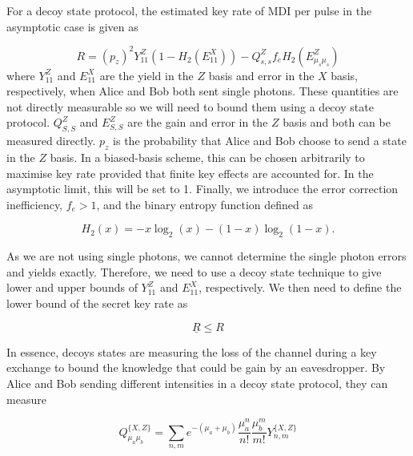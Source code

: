 For a decoy state protocol, the estimated key rate of \ac{MDI} per pulse in the asymptotic case is given as \cite{Lo2014}

\begin{equation}
	R = (p_z)^2 Y_{11}^Z \left(1 - H_2(E_{11}^X)\right) - Q_{s,s}^Z f_e H_2(E_{\mu_s\mu_s}^Z)
\end{equation}
where $Y_{11}^Z$ and $E_{11}^X$ are the yield in the $Z$ basis and error in the $X$ basis, respectively, when Alice and Bob both sent single photons. These quantities are not directly measurable so we will need to bound them using a decoy state protocol. $Q_{S,S}^Z$ and $E_{S,S}^Z$ are the gain and error in the $Z$ basis and both can be measured directly. $p_z$  is the probability that Alice and Bob choose to send a state in the $Z$ basis. In a biased-basis scheme, this can be chosen arbitrarily to maximise key rate provided that finite key effects are accounted for. In the asymptotic limit, this will be set to 1. Finally, we introduce the error correction inefficiency, $f_e>1$, and the binary entropy function defined as

\begin{equation}
	H_2(x) = -x \log_2(x) - (1-x) \log_2(1-x).
\end{equation}


As we are not using single photons, we cannot determine the single photon errors and yields exactly. Therefore, we need to use a decoy state technique \cite{Lo2005} to give lower and upper bounds of $Y_{11}^Z$ and $E_{11}^X$, respectively. We then need to define the lower bound of the secret key rate as

\begin{equation}
	\underline{R} \leq R
\end{equation}

In essence, decoys states are measuring the loss of the channel during a key exchange to bound the knowledge that could be gain by an eavesdropper.  By Alice and Bob sending different intensities in a decoy state protocol, they can measure

\begin{equation}
	\label{eq:gain1}
	Q^{\{X, Z\}}_{\mu_a \mu_b} = \sum_{n,m} e^{-(\mu_a + \mu_b)}\frac{\mu_a^n}{n!}\frac{\mu_b^m}{m!} Y_{n,m}^{\{X, Z\}}
\end{equation}

